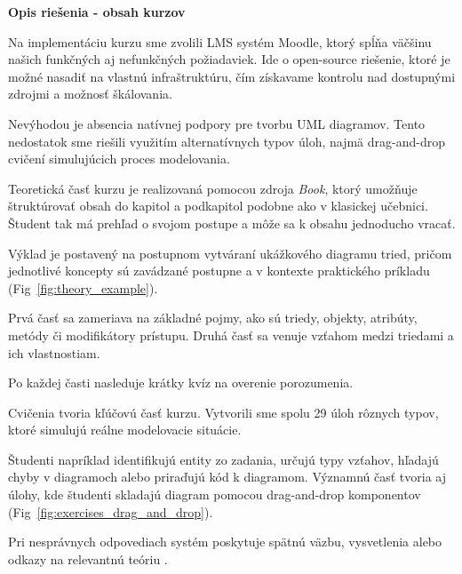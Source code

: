\textbf{Opis riešenia - obsah kurzov}

Na implementáciu kurzu sme zvolili LMS systém Moodle, ktorý spĺňa väčšinu našich funkčných aj nefunkčných požiadaviek. Ide o open-source riešenie, ktoré je možné nasadiť na vlastnú infraštruktúru, čím získavame kontrolu nad dostupnými zdrojmi a možnosť škálovania.


Nevýhodou je absencia natívnej podpory pre tvorbu UML diagramov. Tento nedostatok sme riešili využitím alternatívnych typov úloh, najmä drag-and-drop cvičení simulujúcich proces modelovania.


Teoretická časť kurzu je realizovaná pomocou zdroja \textit{Book}, ktorý umožňuje štruktúrovať obsah do kapitol a podkapitol podobne ako v klasickej učebnici. Študent tak má prehľad o svojom postupe a môže sa k obsahu jednoducho vracať. 

Výklad je postavený na postupnom vytváraní ukážkového diagramu tried, pričom jednotlivé koncepty sú zavádzané postupne a v kontexte praktického príkladu (Fig~\ref{fig:theory_example}). 

Prvá časť sa zameriava na základné pojmy, ako sú triedy, objekty, atribúty, metódy či modifikátory prístupu. Druhá časť sa venuje vzťahom medzi triedami a ich vlastnostiam.

Po každej časti nasleduje krátky kvíz na overenie porozumenia.


Cvičenia tvoria kľúčovú časť kurzu. Vytvorili sme spolu 29 úloh rôznych typov, ktoré simulujú reálne modelovacie situácie.

Študenti napríklad identifikujú entity zo zadania, určujú typy vzťahov, hľadajú chyby v diagramoch alebo priraďujú kód k diagramom. Významnú časť tvoria aj úlohy, kde študenti skladajú diagram pomocou drag-and-drop komponentov (Fig~\ref{fig:exercises_drag_and_drop}).

Pri nesprávnych odpovediach systém poskytuje spätnú väzbu, vysvetlenia alebo odkazy na relevantnú teóriu .

